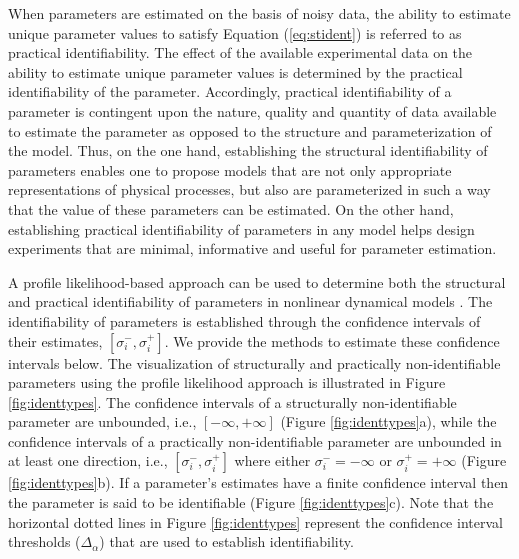 \documentclass[10pt]{report}
\begin{document}
	When parameters are estimated on the basis of noisy data, the ability to estimate unique parameter values to satisfy Equation (\ref{eq:stident}) is referred to as practical identifiability. The effect of the available experimental data on the ability to estimate unique parameter values is determined by the practical identifiability of the parameter. Accordingly, practical identifiability of a parameter is contingent upon the nature, quality and quantity of data available to estimate the parameter as opposed to the structure and parameterization of the model. 
	Thus, on the one hand, establishing the structural identifiability of parameters enables one to propose models that are not only appropriate representations of physical processes, but also are parameterized in such a way that the value of these parameters can be estimated. On the other hand, establishing practical identifiability of parameters in any model helps design experiments that are minimal, informative and useful for parameter estimation. 
	
	A profile likelihood-based approach can be used to determine both the structural and practical identifiability of parameters in nonlinear dynamical models \parencite{Raue2009a}. The identifiability of parameters is established through the confidence intervals of their estimates, $\left[\sigma_{i}^-,\sigma_{i}^+\right]$. We provide the methods to estimate these confidence intervals below. The visualization of structurally and practically non-identifiable parameters using the profile likelihood approach is illustrated in Figure \ref{fig:identtypes}. The confidence intervals of a structurally non-identifiable parameter are unbounded, i.e., $\left[-\infty, +\infty\right]$ (Figure \ref{fig:identtypes}a), while the confidence intervals of a practically non-identifiable parameter are unbounded in at least one direction, i.e., $\left[\sigma_{i}^-,\sigma_{i}^+\right]$ where either $\sigma_{i}^- = -\infty$ or $\sigma_{i}^+ = +\infty$ (Figure \ref{fig:identtypes}b). If a parameter's estimates have a finite confidence interval then the parameter is said to be identifiable (Figure \ref{fig:identtypes}c). Note that the horizontal dotted lines in Figure \ref{fig:identtypes} represent the confidence interval thresholds ($\Delta_{\alpha}$) that are used to establish identifiability.
		
\end{document}
